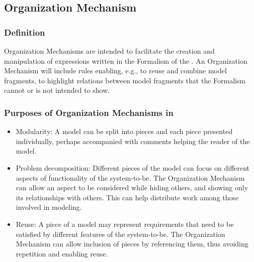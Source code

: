 \documentclass[10pt, final, conference, compsocconf]{IEEEtran}
\begin{document}



\subsection{Organization Mechanism}\label{s:components:organization-mechanism}

\subsubsection{Definition} Organization Mechanisms are intended to facilitate the creation and manipulation of expressions written in the Formalism of the . An Organization Mechanism will include rules enabling, e.g., to reuse and combine model fragments, to highlight relations between model fragments that the Formalism cannot or is not intended to show.

\subsubsection{Purposes of Organization Mechanisms in }
\begin{itemize}
\item{Modularity: A model can be split into pieces and each piece presented individually, perhaps accompanied with comments helping the reader of the model.}
\item{Problem decomposition: Different pieces of the model can focus on different aspects of functionality of the system-to-be. The Organization Mechanism can allow an aspect to be considered while hiding others, and showing only its relationships with others. This can help distribute work among those involved in modeling.}
\item{Reuse: A piece of a model may represent requirements that need to be satisfied by different features of the system-to-be. The Organization Mechanism can allow inclusion of pieces by referencing them, thus avoiding repetition and enabling reuse.}
\end{itemize}

\end{document}
